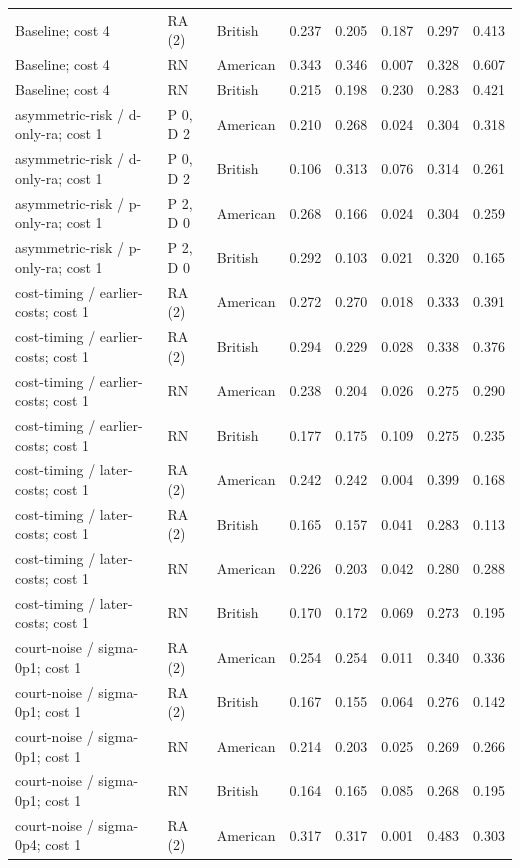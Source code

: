 \documentclass[10pt]{article}
\begin{document}
\begin{longtable}{@{}p{3.0in}llrrrrr@{}}
Baseline; cost 4 & RA (2) & British & 0.237 & 0.205 & 0.187 & 0.297 & 0.413\\
Baseline; cost 4 & RN & American & 0.343 & 0.346 & 0.007 & 0.328 & 0.607\\
Baseline; cost 4 & RN & British & 0.215 & 0.198 & 0.230 & 0.283 & 0.421\\
asymmetric-risk / d-only-ra; cost 1 & P 0, D 2 & American & 0.210 & 0.268 & 0.024 & 0.304 & 0.318\\
asymmetric-risk / d-only-ra; cost 1 & P 0, D 2 & British & 0.106 & 0.313 & 0.076 & 0.314 & 0.261\\
asymmetric-risk / p-only-ra; cost 1 & P 2, D 0 & American & 0.268 & 0.166 & 0.024 & 0.304 & 0.259\\
asymmetric-risk / p-only-ra; cost 1 & P 2, D 0 & British & 0.292 & 0.103 & 0.021 & 0.320 & 0.165\\
cost-timing / earlier-costs; cost 1 & RA (2) & American & 0.272 & 0.270 & 0.018 & 0.333 & 0.391\\
cost-timing / earlier-costs; cost 1 & RA (2) & British & 0.294 & 0.229 & 0.028 & 0.338 & 0.376\\
cost-timing / earlier-costs; cost 1 & RN & American & 0.238 & 0.204 & 0.026 & 0.275 & 0.290\\
cost-timing / earlier-costs; cost 1 & RN & British & 0.177 & 0.175 & 0.109 & 0.275 & 0.235\\
cost-timing / later-costs; cost 1 & RA (2) & American & 0.242 & 0.242 & 0.004 & 0.399 & 0.168\\
cost-timing / later-costs; cost 1 & RA (2) & British & 0.165 & 0.157 & 0.041 & 0.283 & 0.113\\
cost-timing / later-costs; cost 1 & RN & American & 0.226 & 0.203 & 0.042 & 0.280 & 0.288\\
cost-timing / later-costs; cost 1 & RN & British & 0.170 & 0.172 & 0.069 & 0.273 & 0.195\\
court-noise / sigma-0p1; cost 1 & RA (2) & American & 0.254 & 0.254 & 0.011 & 0.340 & 0.336\\
court-noise / sigma-0p1; cost 1 & RA (2) & British & 0.167 & 0.155 & 0.064 & 0.276 & 0.142\\
court-noise / sigma-0p1; cost 1 & RN & American & 0.214 & 0.203 & 0.025 & 0.269 & 0.266\\
court-noise / sigma-0p1; cost 1 & RN & British & 0.164 & 0.165 & 0.085 & 0.268 & 0.195\\
court-noise / sigma-0p4; cost 1 & RA (2) & American & 0.317 & 0.317 & 0.001 & 0.483 & 0.303\\

\end{longtable}
\end{document}
